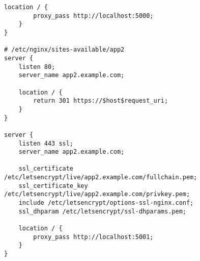 \begin{itemize}
\begin{lstlisting}[language=none]
    location / {
        proxy_pass http://localhost:5000;
    }
}

# /etc/nginx/sites-available/app2
server {
    listen 80;
    server_name app2.example.com;

    location / {
        return 301 https://$host$request_uri;
    }
}

server {
    listen 443 ssl;
    server_name app2.example.com;

    ssl_certificate /etc/letsencrypt/live/app2.example.com/fullchain.pem;
    ssl_certificate_key /etc/letsencrypt/live/app2.example.com/privkey.pem;
    include /etc/letsencrypt/options-ssl-nginx.conf;
    ssl_dhparam /etc/letsencrypt/ssl-dhparams.pem;

    location / {
        proxy_pass http://localhost:5001;
    }
}
\end{lstlisting}
\end{itemize}
